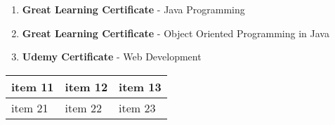 \documentclass{article}[14pt]
\begin{document}
\begin{enumerate}
    \item { \textbf{Great Learning Certificate} - Java Programming}
    \item{\textbf{Great Learning Certificate} - Object Oriented Programming in Java}
    \item{\textbf{Udemy Certificate} - Web Development}

\end{enumerate}

\begin{tabularx}{0.8\textwidth} { 
  | >{\raggedright\arraybackslash}X 
  | >{\centering\arraybackslash}X 
  | >{\raggedleft\arraybackslash}X | }
 \hline
 item 11 & item 12 & item 13 \\
 \hline
 item 21  & item 22  & item 23  \\
\hline
\end{tabularx}



\end{document}
